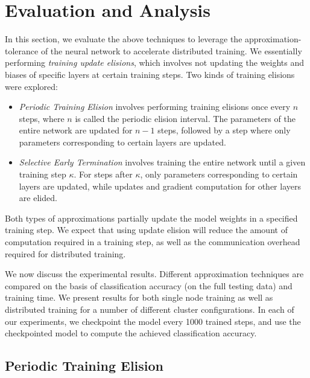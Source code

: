 \section{Evaluation and Analysis}
In this section, we evaluate the above techniques to leverage the approximation-tolerance of the neural network to accelerate distributed training. We essentially performing \textit{training update elisions}, which involves not updating the weights and biases of specific layers at certain training steps. Two kinds of training elisions were explored:
\begin{itemize}
	\item \textit{Periodic Training Elision} involves performing training elisions once every $n$ steps, where $n$ is called the periodic elision interval. The parameters of the entire network are updated for $n-1$ steps, followed by a step where only parameters corresponding to certain layers are updated.
	\item \textit{Selective Early Termination} involves training the entire network until a given training step $\kappa$. For steps after $\kappa$, only parameters corresponding to certain layers are updated, while updates and gradient computation for other layers are elided.

\end{itemize}

Both types of approximations partially update the model weights in a specified training step. We expect that using update elision will  reduce the amount of computation required in a training step, as well as the communication overhead required for distributed training. 

We now discuss the experimental results. Different approximation techniques are compared on the basis of classification accuracy (on the full testing data) and training time. We present results for both single node training as well as distributed training for a number of different cluster configurations. In each of our experiments, we checkpoint the model every 1000 trained steps, and use the checkpointed model to compute the achieved classification accuracy.

\subsection{Periodic Training Elision}

